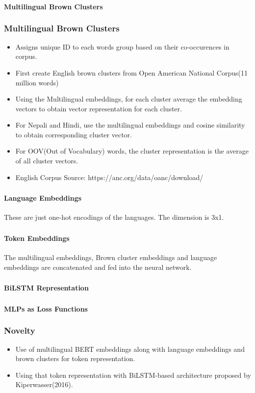 \documentclass{beamer}
\newcommand{\nn}{\\~\\}
\begin{document}
\begin{frame}
\frametitle{}
\huge\textbf{Multilingual Brown Clusters}
\end{frame}

\begin{frame}
\frametitle{Multilingual Brown Clusters}
\begin{itemize}
    \item Assigns unique ID to each words group based on their co-occurences in corpus.
    \item First create English brown clusters from Open American National Corpus(11 million words)
    \item Using the Multilingual embeddings, for each cluster average the embedding vectors to obtain vector representation for each cluster.
    \item For Nepali and Hindi, use the multilingual embeddings and cosine similarity to obtain corresponding cluster vector.
    \item For OOV(Out of Vocabulary) words, the cluster representation is the average of all cluster vectors.
    \item English Corpus Source: https://anc.org/data/oanc/download/
\end{itemize}
\end{frame}

\begin{frame}
\frametitle{}
{\huge\textbf{Language Embeddings}}
\nn
These are just one-hot encodings of the languages. The dimension is 3x1.
\end{frame}

\begin{frame}
\frametitle{}
{\huge\textbf{Token Embeddings}}
\nn
The multilingual embeddings, Brown cluster embeddings and language embeddings are concatenated and fed into the neural network.
\end{frame}

\begin{frame}
\frametitle{}
\huge\textbf{BiLSTM Representation}
\end{frame}

\begin{frame}
\frametitle{}
\huge\textbf{MLPs as Loss Functions}
\end{frame}


\begin{frame}
\frametitle{Novelty}
\begin{itemize}
    \item Use of multilingual BERT embeddings along with language embeddings and brown clusters for token representation.
    \item Using that token representation with BiLSTM-based architecture proposed by Kiperwasser(2016).
\end{itemize}
\end{frame}
\end{document}
